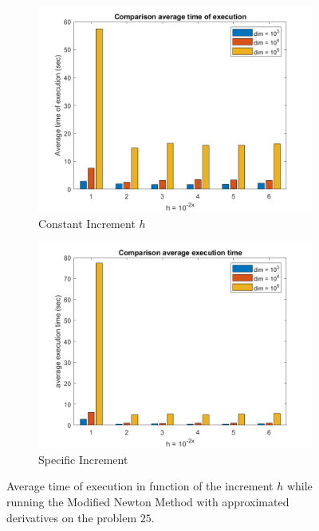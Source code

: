 \begin{figure}[htbp]
    \centering
    \begin{subfigure}[t]{0.45\textwidth}  %
        \centering
        \includegraphics[width=\textwidth]{img/pb25_MN_difffinite_COST_timeofexec.png}
        \caption{Constant Increment $h$}
    \end{subfigure}
    \hspace{1cm} %
    \begin{subfigure}[t]{0.45\textwidth}
        \centering
        \includegraphics[width=\textwidth]{img/pb25_MN_difffinite_REL_timeofexec.png}
        \caption{Specific Increment }
    \end{subfigure}
    \caption{ \small Average time of execution in function of the increment $h$  while running the Modified Newton Method with approximated derivatives on the problem $25$.}
\end{figure}


